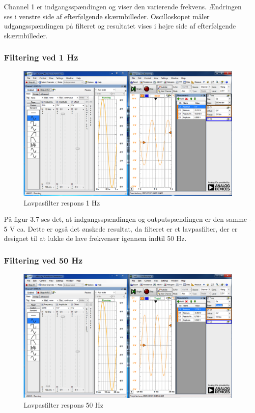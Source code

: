 Channel 1 er indgangsspændingen og viser den varierende frekvens. Ændringen ses i venstre side af efterfølgende skærmbilleder. 
Oscilloskopet måler udgangsspændingen på filteret og resultatet vises i højre side af efterfølgende skærmbilleder.

\subsubsection{Filtering ved 1 Hz}
\begin{figure}[H]
	\centering
	\includegraphics[width=1\textwidth]{Figurer/Snip20151202_23}
	\caption{Lavpasfilter respons 1 Hz}
	\label{fig:Filter}
\end{figure}

På figur 3.7 ses det, at indgangsspændingen  og outputspændingen er den samme - 5 V ca. Dette er også det ønskede resultat, da filteret er et lavpasfilter, der er designet til at lukke de lave frekvenser igennem indtil 50 Hz. 
 
\subsubsection{Filtering ved 50 Hz}
\begin{figure}[H]
	\centering
	\includegraphics[width=1\textwidth]{Figurer/Snip20151202_24}
	\caption{Lavpasfilter respons 50 Hz}
	\label{fig:Filter}
\end{figure}

